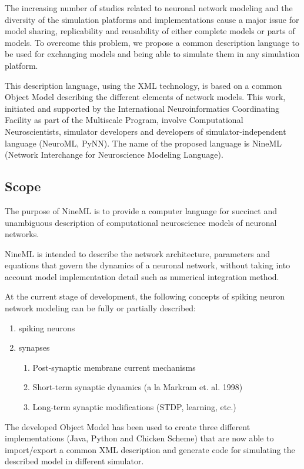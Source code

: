 \documentclass[draftspec]{ninemlspec}
\begin{document}
The increasing number of studies related to neuronal network modeling
and the diversity of the simulation platforms and implementations
cause a major issue for model sharing, replicability and reusability
of either complete models or parts of models. To overcome this problem,
we propose a
common description language to be used for exchanging models and being
able to simulate them in any simulation platform.

This description language, using the XML technology, is based on a
common Object Model describing the different elements of network
models. This work, initiated and supported by the International
Neuroinformatics Coordinating Facility as part of the Multiscale
Program, involve Computational Neuroscientists, simulator developers and
developers of simulator-independent language (NeuroML, PyNN).  The name of the
proposed language is NineML (Network Interchange for Neuroscience Modeling
Language).

\subsection{Scope}

The purpose of NineML is to provide a computer language for
succinct and unambiguous description of computational neuroscience models of neuronal networks.

NineML is intended to describe the network architecture, parameters
and equations that govern the dynamics of a neuronal network, without
taking into account model implementation detail such as numerical integration
method.

At the current stage of development, the following concepts of spiking neuron
network modeling can be fully or partially described:

\begin{enumerate}
\item spiking neurons
\item synapses
\begin{enumerate}
\item Post-synaptic membrane current mechanisms
\item Short-term synaptic dynamics (a la Markram et. al. 1998)
\item Long-term synaptic modifications (STDP, learning, etc.)
\end{enumerate}
\end{enumerate}

The developed Object Model has been used to create three different
implementations (Java, Python and Chicken Scheme) that are now able to
import/export a common XML description and generate code for simulating the
described model in different simulator.
\end{document}
